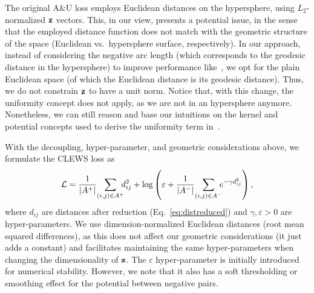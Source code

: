 The original A\&U loss employs Euclidean distances on the hypersphere, using $L_2$-normalized $\textbf{z}$ vectors. This, in our view, presents a potential issue, in the sense that the employed distance function does not match with the geometric structure of the space (Euclidean vs.\ hypersphere surface, respectively). In our approach, instead of considering the negative arc length (which corresponds to the geodesic distance in the hypersphere) to improve performance like~\citet{koishekenov_geometric_2023}, we opt for the plain Euclidean space (of which the Euclidean distance is its geodesic distance). Thus, we do not constrain $\textbf{z}$ to have a unit norm. Notice that, with this change, the uniformity concept does not apply, as we are not in an hypersphere anymore. Nonetheless, we can still reason and base our intuitions on the kernel and potential concepts used to derive the uniformity term in~\citet{wang_understanding_2020}.

With the decoupling, hyper-parameter, and geometric considerations above, we formulate the CLEWS loss as
\begin{equation*}
\fu{L} = \frac{1}{|A^+|}\!\sum_{(i,j)\in A^+}\!\!\!d_{ij}^2 + \log\left(\varepsilon + \frac{1}{|A^-|}\!\sum_{(i,j)\in A^-}\!\!\!e^{-\gamma d^2_{ij}}\right) ,
\end{equation*}
where $d_{ij}$ are distances after reduction (Eq.~\ref{eq:distreduced}) and $\gamma,\varepsilon>0$ %
are hyper-parameters. We use dimension-normalized Euclidean distances (root mean squared differences), as this does not affect our geometric considerations (it just adds a constant) and facilitates maintaining the same hyper-parameters when changing the dimensionality of $\textbf{z}$. The $\varepsilon$ hyper-parameter is initially introduced for numerical stability. However, we note that it also has a soft thresholding or smoothing effect for the potential between negative pairs. 

